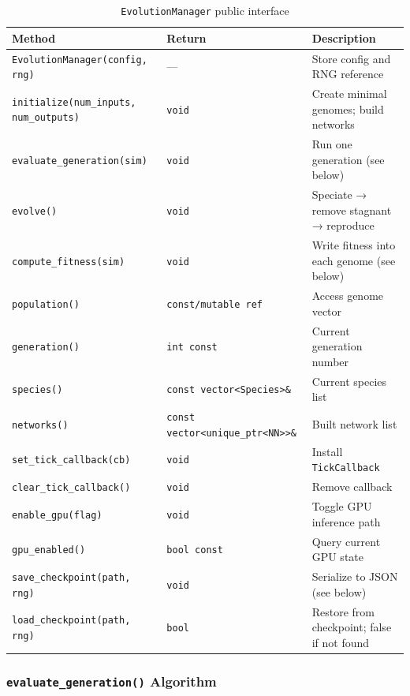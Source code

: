 \begin{table}[H]
\centering\small
\caption{\texttt{EvolutionManager} public interface}
\begin{tabularx}{\textwidth}{@{}llX@{}}
\toprule
\textbf{Method} & \textbf{Return} & \textbf{Description} \\
\midrule
\texttt{EvolutionManager(config, rng)} & — & Store config and RNG reference \\
\texttt{initialize(num\_inputs, num\_outputs)} & \texttt{void} & Create minimal genomes; build networks \\
\texttt{evaluate\_generation(sim)} & \texttt{void} & Run one generation (see below) \\
\texttt{evolve()} & \texttt{void} & Speciate → remove stagnant → reproduce \\
\texttt{compute\_fitness(sim)} & \texttt{void} & Write fitness into each genome (see below) \\
\texttt{population()} & \texttt{const/mutable ref} & Access genome vector \\
\texttt{generation()} & \texttt{int const} & Current generation number \\
\texttt{species()} & \texttt{const vector<Species>\&} & Current species list \\
\texttt{networks()} & \texttt{const vector<unique\_ptr<NN>>\&} & Built network list \\
\texttt{set\_tick\_callback(cb)} & \texttt{void} & Install \texttt{TickCallback} \\
\texttt{clear\_tick\_callback()} & \texttt{void} & Remove callback \\
\texttt{enable\_gpu(flag)} & \texttt{void} & Toggle GPU inference path \\
\texttt{gpu\_enabled()} & \texttt{bool const} & Query current GPU state \\
\texttt{save\_checkpoint(path, rng)} & \texttt{void} & Serialize to JSON (see below) \\
\texttt{load\_checkpoint(path, rng)} & \texttt{bool} & Restore from checkpoint; false if not found \\
\bottomrule
\end{tabularx}
\end{table}

\subsubsection{\texttt{evaluate\_generation()} Algorithm}

